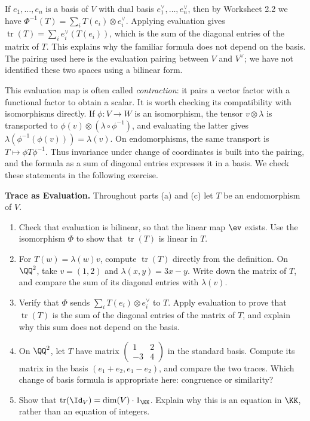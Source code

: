 \documentclass[12pt,reqno]{amsart}
\DeclareMathOperator{\tr}{tr}
\begin{document}
If $e_1,\ldots,e_n$ is a basis of $V$ with dual basis $e_1^{\vee},\ldots,e_n^{\vee}$, then by Worksheet 2.2 we have $\Phi^{-1}(T)=\sum_iT(e_i)\otimes e_i^{\vee}$. Applying evaluation gives $\tr(T)=\sum_ie_i^{\vee}(T(e_i))$, which is the sum of the diagonal entries of the matrix of $T$. This explains why the familiar formula does not depend on the basis. The pairing used here is the evaluation pairing between $V$ and $V^{\vee}$; we have not identified these two spaces using a bilinear form.

This evaluation map is often called \emph{contraction}: it pairs a vector factor with a functional factor to obtain a scalar. It is worth checking its compatibility with isomorphisms directly. If $\phi:V\to W$ is an isomorphism, the tensor $v\otimes\lambda$ is transported to $\phi(v)\otimes(\lambda\circ\phi^{-1})$, and evaluating the latter gives $\lambda(\phi^{-1}(\phi(v)))=\lambda(v)$. On endomorphisms, the same transport is $T\mapsto\phi T\phi^{-1}$. Thus invariance under change of coordinates is built into the pairing, and the formula as a sum of diagonal entries expresses it in a basis. We check these statements in the following exercise.

\hrulefill

\begin{problems}[before=\Needspace{5\baselineskip}]
\item\label{b:trace} \textbf{Trace as Evaluation.} Throughout parts (a) and (c) let $T$ be an endomorphism of $V$.
\begin{enumerate}
\item Check that evaluation is bilinear, so that the linear map $\ev$ exists. Use the isomorphism $\Phi$ to show that $\tr(T)$ is linear in $T$.
\item For $T(w)=\lambda(w)v$, compute $\tr(T)$ directly from the definition. On $\QQ^2$, take $v=(1,2)$ and $\lambda(x,y)=3x-y$. Write down the matrix of $T$, and compare the sum of its diagonal entries with $\lambda(v)$.
\item Verify that $\Phi$ sends $\sum_iT(e_i)\otimes e_i^{\vee}$ to $T$. Apply evaluation to prove that $\tr(T)$ is the sum of the diagonal entries of the matrix of $T$, and explain why this sum does not depend on the basis.
\item On $\QQ^2$, let $T$ have matrix $\left(\begin{smallmatrix}1&2\\-3&4\end{smallmatrix}\right)$ in the standard basis. Compute its matrix in the basis $(e_1+e_2,e_1-e_2)$, and compare the two traces. Which change of basis formula is appropriate here: congruence or similarity?
\item Show that $\tr(\Id_V)=\dim(V)\cdot1_{\KK}$. Explain why this is an equation in $\KK$, rather than an equation of integers.
\end{enumerate}
\end{problems}
\end{document}
